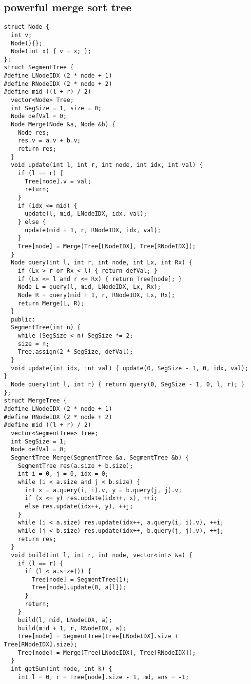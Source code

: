 \documentclass[twoside]{article}
\begin{document}
\begin{multicols*}{2}
{\subsection*{powerful merge sort tree}
}
\begin{verbatim}
struct Node {
  int v;
  Node(){};
  Node(int x) { v = x; };
};
struct SegmentTree {
#define LNodeIDX (2 * node + 1)
#define RNodeIDX (2 * node + 2)
#define mid ((l + r) / 2)
  vector<Node> Tree;
  int SegSize = 1, size = 0;
  Node defVal = 0;
  Node Merge(Node &a, Node &b) {
    Node res;
    res.v = a.v + b.v;
    return res;
  }
  void update(int l, int r, int node, int idx, int val) {
    if (l == r) {
      Tree[node].v = val;
      return;
    }
    if (idx <= mid) {
      update(l, mid, LNodeIDX, idx, val);
    } else {
      update(mid + 1, r, RNodeIDX, idx, val);
    }
    Tree[node] = Merge(Tree[LNodeIDX], Tree[RNodeIDX]);
  }
  Node query(int l, int r, int node, int Lx, int Rx) {
    if (Lx > r or Rx < l) { return defVal; }
    if (Lx <= l and r <= Rx) { return Tree[node]; }
    Node L = query(l, mid, LNodeIDX, Lx, Rx);
    Node R = query(mid + 1, r, RNodeIDX, Lx, Rx);
    return Merge(L, R);
  }
  public:
  SegmentTree(int n) {
    while (SegSize < n) SegSize *= 2;
    size = n;
    Tree.assign(2 * SegSize, defVal);
  }
  void update(int idx, int val) { update(0, SegSize - 1, 0, idx, val); }
  Node query(int l, int r) { return query(0, SegSize - 1, 0, l, r); }
};
struct MergeTree {
#define LNodeIDX (2 * node + 1)
#define RNodeIDX (2 * node + 2)
#define mid ((l + r) / 2)
  vector<SegmentTree> Tree;
  int SegSize = 1;
  Node defVal = 0;
  SegmentTree Merge(SegmentTree &a, SegmentTree &b) {
    SegmentTree res(a.size + b.size);
    int i = 0, j = 0, idx = 0;
    while (i < a.size and j < b.size) {
      int x = a.query(i, i).v, y = b.query(j, j).v;
      if (x <= y) res.update(idx++, x), ++i;
      else res.update(idx++, y), ++j;
    }
    while (i < a.size) res.update(idx++, a.query(i, i).v), ++i;
    while (j < b.size) res.update(idx++, b.query(j, j).v), ++j;
    return res;
  }
  void build(int l, int r, int node, vector<int> &a) {
    if (l == r) {
      if (l < a.size()) {
        Tree[node] = SegmentTree(1);
        Tree[node].update(0, a[l]);
      }
      return;
    }
    build(l, mid, LNodeIDX, a);
    build(mid + 1, r, RNodeIDX, a);
    Tree[node] = SegmentTree(Tree[LNodeIDX].size + Tree[RNodeIDX].size);
    Tree[node] = Merge(Tree[LNodeIDX], Tree[RNodeIDX]);
  }
  int getSum(int node, int k) {
    int l = 0, r = Tree[node].size - 1, md, ans = -1;

\end{verbatim}
\end{multicols*}
\end{document}
